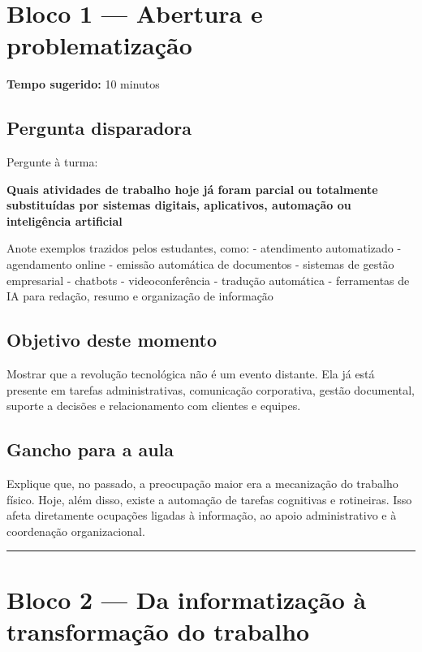 \documentclass[
]{book}
\theoremstyle{definition}
\theoremstyle{definition}
\theoremstyle{definition}
\theoremstyle{definition}
\theoremstyle{remark}
\begin{document}
\section{Bloco 1 --- Abertura e problematização}\label{bloco-1-abertura-e-problematizauxe7uxe3o}

\textbf{Tempo sugerido:} 10 minutos

\subsection{Pergunta disparadora}\label{pergunta-disparadora}

Pergunte à turma:

\textbf{Quais atividades de trabalho hoje já foram parcial ou totalmente substituídas por sistemas digitais, aplicativos, automação ou inteligência artificial}

Anote exemplos trazidos pelos estudantes, como:
- atendimento automatizado
- agendamento online
- emissão automática de documentos
- sistemas de gestão empresarial
- chatbots
- videoconferência
- tradução automática
- ferramentas de IA para redação, resumo e organização de informação

\subsection{Objetivo deste momento}\label{objetivo-deste-momento}

Mostrar que a revolução tecnológica não é um evento distante. Ela já está presente em tarefas administrativas, comunicação corporativa, gestão documental, suporte a decisões e relacionamento com clientes e equipes.

\subsection{Gancho para a aula}\label{gancho-para-a-aula}

Explique que, no passado, a preocupação maior era a mecanização do trabalho físico. Hoje, além disso, existe a automação de tarefas cognitivas e rotineiras. Isso afeta diretamente ocupações ligadas à informação, ao apoio administrativo e à coordenação organizacional.

\begin{center}\rule{0.5\linewidth}{0.5pt}\end{center}

\section{Bloco 2 --- Da informatização à transformação do trabalho}\label{bloco-2-da-informatizauxe7uxe3o-uxe0-transformauxe7uxe3o-do-trabalho}
\end{document}
